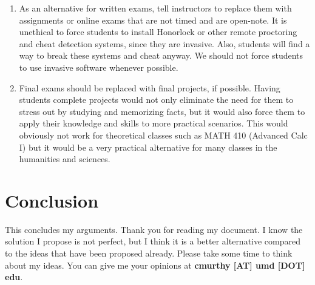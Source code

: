 \documentclass[12pt]{article}
\begin{document}
\begin{enumerate}
    \item As an alternative for written exams, tell instructors to replace them with assignments or online exams that are not timed and are open-note. It is unethical to force students to install Honorlock or other remote proctoring and cheat detection systems, since they are invasive. Also, students will find a way to break these systems and cheat anyway. We should not force students to use invasive software whenever possible.
    \item Final exams should be replaced with final projects, if possible. Having students complete projects would not only eliminate the need for them to stress out by studying and memorizing facts, but it would also force them to apply their knowledge and skills to more practical scenarios. This would obviously not work for theoretical classes such as MATH 410 (Advanced Calc I) but it would be a very practical alternative for many classes in the humanities and sciences.
\end{enumerate}

\newpage
\section{Conclusion}
This concludes my arguments. Thank you for reading my document. I know the solution I propose is not perfect, but I think it is a better alternative compared to the ideas that have been proposed already. Please take some time to think about my ideas. You can give me your opinions at \textbf{cmurthy [AT] umd [DOT] edu}.
\end{document}
